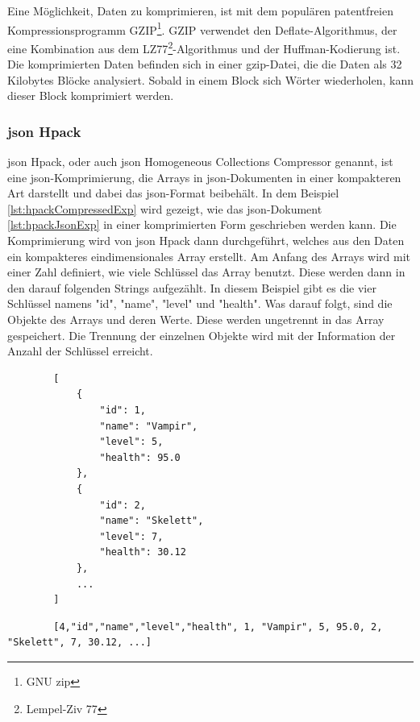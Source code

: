 Eine Möglichkeit, Daten zu komprimieren, ist mit dem populären patentfreien Kompressionsprogramm GZIP\footnote{GNU zip}. GZIP verwendet den Deflate-Algorithmus, der eine Kombination aus dem  LZ77\footnote{Lempel-Ziv 77}-Algorithmus und der Huffman-Kodierung ist. Die komprimierten Daten befinden sich in einer gzip-Datei, die die Daten als 32 Kilobytes Blöcke analysiert. Sobald in einem Block sich Wörter wiederholen, kann dieser Block komprimiert werden. \cite{gnuGzip}\cite{1414952}\cite{seobilityGzipFunktioniert}

\subsubsection{\ac{json} Hpack}
\ac{json} Hpack, oder auch \ac{json} Homogeneous Collections Compressor genannt, ist eine \ac{json}-Komprimierung, die Arrays in \ac{json}-Dokumenten in einer kompakteren Art darstellt und dabei das \ac{json}-Format beibehält. In dem Beispiel \ref{lst:hpackCompressedExp} wird gezeigt, wie das \ac{json}-Dokument \ref{lst:hpackJsonExp} in einer komprimierten Form geschrieben werden kann. Die Komprimierung wird von \ac{json} Hpack dann durchgeführt, welches aus den Daten ein kompakteres eindimensionales Array erstellt. Am Anfang des Arrays wird mit einer Zahl definiert, wie viele Schlüssel das Array benutzt. Diese werden dann in den darauf folgenden Strings aufgezählt. In diesem Beispiel gibt es die vier Schlüssel namens "id", "name", "level" und "health". Was darauf folgt, sind die Objekte des Arrays und deren Werte. Diese werden ungetrennt in das Array gespeichert. Die Trennung der einzelnen Objekte wird mit der Information der Anzahl der Schlüssel erreicht.
\cite{webreflectionLastVersion}

\begin{listing}[htp]
    \begin{verbatim} 
        [
            {
                "id": 1,
                "name": "Vampir",
                "level": 5,
                "health": 95.0
            },
            {
                "id": 2,
                "name": "Skelett",
                "level": 7,
                "health": 30.12
            },
            ...
        ]                   
    \end{verbatim}
    \caption{}
    \label{lst:hpackJsonExp}
\end{listing}

\begin{listing}[htp]
    \begin{verbatim} 
        [4,"id","name","level","health", 1, "Vampir", 5, 95.0, 2, "Skelett", 7, 30.12, ...]                  
    \end{verbatim}
    \caption{}
    \label{lst:hpackCompressedExp}
\end{listing}


